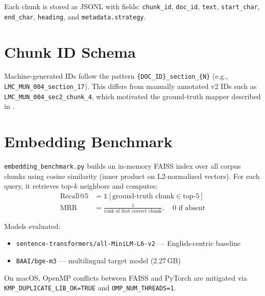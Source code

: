 Each chunk is stored as JSONL with fields: \texttt{chunk\_id}, \texttt{doc\_id}, \texttt{text}, \texttt{start\_char}, \texttt{end\_char}, \texttt{heading}, and \texttt{metadata.strategy}.

\section{Chunk ID Schema}
Machine-generated IDs follow the pattern \texttt{\{DOC\_ID\}\_section\_\{N\}} (e.g., \texttt{LMC\_MUN\_004\_section\_17}). This differs from manually annotated v2 IDs such as \texttt{LMC\_MUN\_004\_sec2\_chunk\_4}, which motivated the ground-truth mapper described in .

\section{Embedding Benchmark}
\texttt{embedding\_benchmark.py} builds an in-memory FAISS index over all corpus chunks using cosine similarity (inner product on L2-normalized vectors). For each query, it retrieves top-$k$ neighbors and computes:
\begin{align}
  \text{Recall@5} &= \mathbb{1}[\text{ground-truth chunk} \in \text{top-5}] \\
  \text{MRR} &= \frac{1}{\text{rank of first correct chunk}}, \quad 0 \text{ if absent}
\end{align}

Models evaluated:
\begin{itemize}[leftmargin=*]
  \item \texttt{sentence-transformers/all-MiniLM-L6-v2} --- English-centric baseline
  \item \texttt{BAAI/bge-m3} --- multilingual target model (2.27\,GB)
\end{itemize}

On macOS, OpenMP conflicts between FAISS and PyTorch are mitigated via \texttt{KMP\_DUPLICATE\_LIB\_OK=TRUE} and \texttt{OMP\_NUM\_THREADS=1}.

